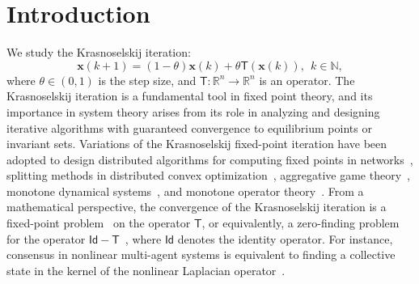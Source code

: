 \documentclass[journal,twoside,web]{ieeecolor}
\newcommand{\rea }{\mathbb{R}}
\newcommand{\nat}{\mathbb{N}}
\newcommand{\xb}{\boldsymbol{x}}
\newcommand{\Ts}{\mathsf{T}}
\newcommand{\Is}{\mathsf{Id}}
\begin{document}

\section{Introduction}\label{sect1}
%
We study the Krasnoselskij iteration:
%
\begin{equation}\label{eq:mainiter_first}
\xb(k+1)=(1-\theta)\xb(k)+\theta \Ts(\xb(k)),\:\: k\in\nat,
\end{equation}
%
where $\theta\in(0,1)$ is the step size, and $\Ts:\rea^n\rightarrow \rea^n$ is an operator. The Krasnoselskij iteration is a fundamental tool in fixed point theory, and its importance in system theory arises from its role in analyzing and designing iterative algorithms with guaranteed convergence to equilibrium points or invariant sets.
%
Variations of the Krasnoselskij fixed-point iteration have been adopted to design distributed algorithms for computing fixed points in networks~\cite{li2020distributed,bastianello2020asynchronous,andrade2022distributed,li2023dot,nian2023continuous}, splitting methods in distributed convex optimization~\cite{giselsson2016linear,pavel2019distributed,dall2019convergence,guo2023disa,bastianello2024robust}, aggregative game theory~\cite{grammatico2015decentralized,grammatico2017dynamic}, monotone dynamical systems~\cite{manfredi2017necessary,jafarpour2022non,Deplano23,deplano24neural,kawano2025contraction,parasnis2025perron}, and monotone operator theory~\cite{winston2020monotone,pabbaraju2021estimating,Jafarpour21}.
%
From a mathematical perspective, the convergence of the Krasnoselskij iteration is a fixed-point problem~\cite{Berinde07} on the operator $\Ts$, or equivalently, a zero-finding problem for the operator $\Is-\Ts$~\cite{Bauschke2017}, where $\Is$ denotes the identity operator.
%
For instance, consensus in nonlinear multi-agent systems is equivalent to finding a collective state in the kernel of the nonlinear Laplacian operator~\cite{bondy2008graph,Deplano18,Deplano20,bonetto2022nonlinear,bronski2014spectral,devries2018kernel,qu2025controllability}.
\end{document}
